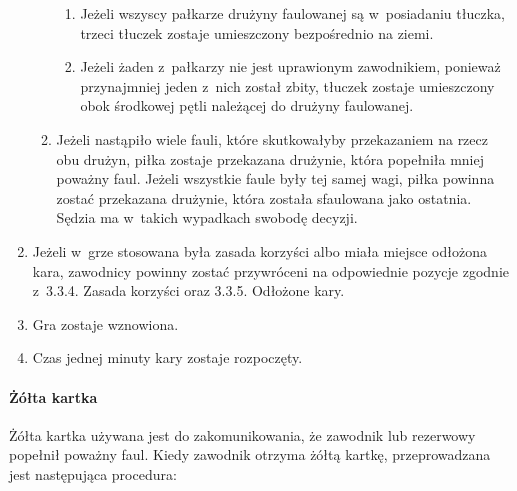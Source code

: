 \documentclass[12pt]{article}
\begin{document}
\begin{enumerate}
\begin{enumerate}
		            \begin{enumerate}
			            \item
			                  Jeżeli wszyscy pałkarze drużyny faulowanej są w~posiadaniu
			                  tłuczka, trzeci tłuczek zostaje umieszczony bezpośrednio na ziemi.
			            \item
			                  Jeżeli żaden z~pałkarzy nie jest uprawionym zawodnikiem, ponieważ
			                  przynajmniej jeden z~nich został zbity, tłuczek zostaje
			                  umieszczony obok środkowej pętli należącej do drużyny faulowanej.
		            \end{enumerate}
		      \item
		            Jeżeli nastąpiło wiele fauli, które skutkowałyby przekazaniem na
		            rzecz obu drużyn, piłka zostaje przekazana drużynie, która popełniła
		            mniej poważny faul. Jeżeli wszystkie faule były tej samej wagi,
		            piłka powinna zostać przekazana drużynie, która została sfaulowana
		            jako ostatnia. Sędzia ma w~takich wypadkach swobodę decyzji.
	      \end{enumerate}
	\item
	      Jeżeli w~grze stosowana była zasada korzyści albo miała miejsce
	      odłożona kara, zawodnicy powinny zostać przywróceni na odpowiednie
	      pozycje zgodnie z~3.3.4. Zasada korzyści oraz 3.3.5. Odłożone kary.
	\item
	      Gra zostaje wznowiona.
	\item
	      Czas jednej minuty kary zostaje rozpoczęty.
\end{enumerate}

\paragraph{Żółta kartka}
Żółta kartka używana jest do
zakomunikowania, że zawodnik lub rezerwowy popełnił poważny faul. Kiedy
zawodnik otrzyma żółtą kartkę, przeprowadzana jest następująca
procedura:
\end{document}
